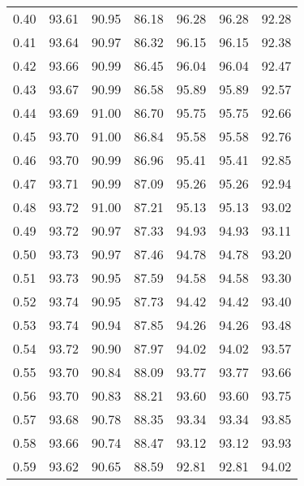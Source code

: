 \begin{tabular}{|c|c|c|c|c|c|c|}
      0.40 &     93.61 &     90.95 &      86.18 &   96.28 &      96.28 &         92.28 \\
      0.41 &     93.64 &     90.97 &      86.32 &   96.15 &      96.15 &         92.38 \\
      0.42 &     93.66 &     90.99 &      86.45 &   96.04 &      96.04 &         92.47 \\
      0.43 &     93.67 &     90.99 &      86.58 &   95.89 &      95.89 &         92.57 \\
      0.44 &     93.69 &     91.00 &      86.70 &   95.75 &      95.75 &         92.66 \\
      0.45 &     93.70 &     91.00 &      86.84 &   95.58 &      95.58 &         92.76 \\
      0.46 &     93.70 &     90.99 &      86.96 &   95.41 &      95.41 &         92.85 \\
      0.47 &     93.71 &     90.99 &      87.09 &   95.26 &      95.26 &         92.94 \\
      0.48 &     93.72 &     91.00 &      87.21 &   95.13 &      95.13 &         93.02 \\
      0.49 &     93.72 &     90.97 &      87.33 &   94.93 &      94.93 &         93.11 \\
      0.50 &     93.73 &     90.97 &      87.46 &   94.78 &      94.78 &         93.20 \\
      0.51 &     93.73 &     90.95 &      87.59 &   94.58 &      94.58 &         93.30 \\
      0.52 &     93.74 &     90.95 &      87.73 &   94.42 &      94.42 &         93.40 \\
      0.53 &     93.74 &     90.94 &      87.85 &   94.26 &      94.26 &         93.48 \\
      0.54 &     93.72 &     90.90 &      87.97 &   94.02 &      94.02 &         93.57 \\
      0.55 &     93.70 &     90.84 &      88.09 &   93.77 &      93.77 &         93.66 \\
      0.56 &     93.70 &     90.83 &      88.21 &   93.60 &      93.60 &         93.75 \\
      0.57 &     93.68 &     90.78 &      88.35 &   93.34 &      93.34 &         93.85 \\
      0.58 &     93.66 &     90.74 &      88.47 &   93.12 &      93.12 &         93.93 \\
      0.59 &     93.62 &     90.65 &      88.59 &   92.81 &      92.81 &         94.02 \\

\end{tabular}
